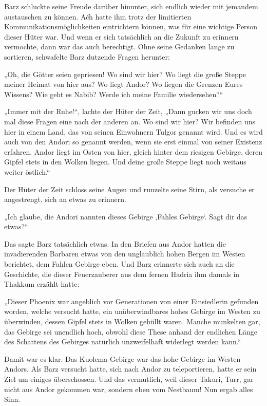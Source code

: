 Barz schluckte seine Freude darüber hinunter, sich endlich wieder mit jemandem austauschen zu können. Aćh hatte ihm trotz der limitierten Kommunikationsmöglichkeiten eintrichtern können, was für eine wichtige Person dieser Hüter war. Und wenn er sich tatsächlich an die Zukunft zu erinnern vermochte, dann war das auch berechtigt. Ohne seine Gedanken lange zu sortieren, schwafelte Barz dutzende Fragen herunter:

„Oh, die Götter seien gepriesen! Wo sind wir hier? Wo liegt die große Steppe meiner Heimat von hier aus? Wo liegt Andor? Wo liegen die Grenzen Eures Wissens? Wie geht es Nabib? Werde ich meine Familie wiedersehen?“

„Immer mit der Ruhe!“, lachte der Hüter der Zeit, „Dann gucken wir uns doch mal diese Fragen eine nach der anderen an. Wo sind wir hier? Wir befinden uns hier in einem Land, das von seinen Einwohnern Tulgor genannt wird. Und es wird auch von den Andori so genannt werden, wenn sie erst einmal von seiner Existenz erfahren. Andor liegt im Osten von hier, gleich hinter dem riesigen Gebirge, deren Gipfel stets in den Wolken liegen. Und deine große Steppe liegt noch weitaus weiter östlich.“

Der Hüter der Zeit schloss seine Augen und runzelte seine Stirn, als versuche er angestrengt, sich an etwas zu erinnern.

„Ich glaube, die Andori nannten dieses Gebirge ‚Fahles Gebirge‘. Sagt dir das etwas?“

Das sagte Barz tatsächlich etwas. In den Briefen aus Andor hatten die invadierenden Barbaren etwas von den unglaublich hohen Bergen im Westen berichtet, dem Fahlen Gebirge eben. Und Barz erinnerte sich auch an die Geschichte, die dieser Feuerzauberer aus dem fernen Hadria ihm damals in Thakkum erzählt hatte:

„Dieser Phoenix war angeblich vor Generationen von einer Einsiedlerin gefunden worden, welche versucht hatte, ein unüberwindbares hohes Gebirge im Westen zu überwinden, dessen Gipfel stets in Wolken gehüllt waren. Manche munkelten gar, das Gebirge sei unendlich hoch, obwohl diese These anhand der endlichen Länge des Schattens des Gebirges natürlich unzweifelhaft widerlegt werden kann.“

Damit war es klar. Das Kuolema-Gebirge war das hohe Gebirge im Westen Andors. Als Barz versucht hatte, sich nach Andor zu teleportieren, hatte er sein Ziel um einiges überschossen. Und das vermutlich, weil dieser Takuri, Turr, gar nicht aus Andor gekommen war, sondern eben vom Nestbaum! Nun ergab alles Sinn.

